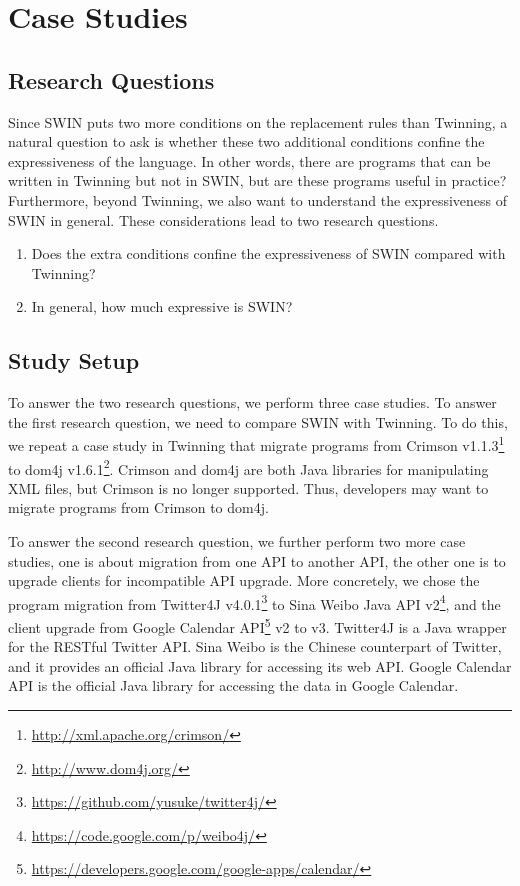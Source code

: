 \section{Case Studies}
\label{sec:evaluation}
\subsection{Research Questions}
Since SWIN puts two more conditions on the replacement rules than
Twinning, a natural question to ask is whether these two additional
conditions confine the expressiveness of the language. In other words,
there are programs that can be written in Twinning but not in SWIN,
but are these programs useful in practice? Furthermore, beyond
Twinning, we also want to understand the expressiveness of SWIN in
general. These considerations lead to two research questions.
\begin{enumerate}
\item Does the extra conditions confine the expressiveness of SWIN
  compared with Twinning? %
\item In general, how much expressive is SWIN?
\end{enumerate}

\subsection{Study Setup}
To answer the two research questions, we perform three case
studies. To answer the first research question, we need to compare
SWIN with Twinning. To do this, we repeat a case study in Twinning
that migrate programs from Crimson v1.1.3\footnote{\url{http://xml.apache.org/crimson/}}
to dom4j v1.6.1\footnote{\url{http://www.dom4j.org/}}. Crimson and
dom4j are both Java libraries for manipulating XML files, but Crimson
is no longer supported. Thus, developers may want to migrate programs
from Crimson to dom4j.

To answer the second research question, we further perform two more
case studies, one is about migration from one API to another API, the
other one is to upgrade clients for incompatible API upgrade. More
concretely, we chose the program migration from Twitter4J v4.0.1\footnote{\url{https://github.com/yusuke/twitter4j/}}
to
Sina Weibo Java API v2\footnote{\url{https://code.google.com/p/weibo4j/}}, 
and the client upgrade from Google Calendar
API\footnote{\url{https://developers.google.com/google-apps/calendar/}}
v2 to v3. Twitter4J is a Java wrapper for the RESTful Twitter
API. Sina Weibo is the Chinese counterpart of Twitter, and it provides
an official Java library for accessing its web API. Google Calendar
API is the official Java library for accessing the data in Google
Calendar.

